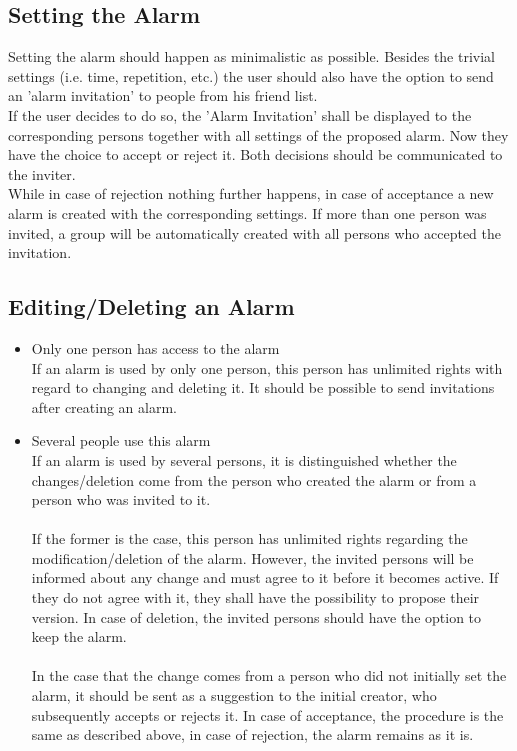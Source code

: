 \documentclass[conference]{IEEEtran}
\begin{document}
\subsection{Setting the Alarm}
Setting the alarm should happen as minimalistic as possible. Besides the trivial settings (i.e. time, repetition, etc.) the user should also have the option to send an 'alarm invitation' to people from his friend list. \\
If the user decides to do so, the 'Alarm Invitation' shall be displayed to the corresponding persons together with all settings of the proposed alarm. Now they have the choice to accept or reject it. Both decisions should be communicated to the inviter. \\
While in case of rejection nothing further happens, in case of acceptance a new alarm is created with the corresponding settings.
If more than one person was invited, a group will be automatically created with all persons who accepted the invitation. 

\subsection{Editing/Deleting an Alarm}
\begin{itemize}
\item Only one person has access to the alarm \\
If an alarm is used by only one person, this person has unlimited rights with regard to changing and deleting it. It should be possible to send invitations after creating an alarm.
\\
\item Several people use this alarm \\
If an alarm is used by several persons, it is distinguished whether the changes/deletion come from the person who created the alarm or from a person who was invited to it.\\
\\If the former is the case, this person has unlimited rights regarding the modification/deletion of the alarm. However, the invited persons will be informed about any change and must agree to it before it becomes active. If they do not agree with it, they shall have the possibility to propose their version. In case of deletion, the invited persons should have the option to keep the alarm.\\
\\In the case that the change comes from a person who did not initially set the alarm, it should be sent as a suggestion to the initial creator, who subsequently accepts or rejects it. In case of acceptance, the procedure is the same as described above, in case of rejection, the alarm remains as it is.
\end{itemize}
\end{document}
